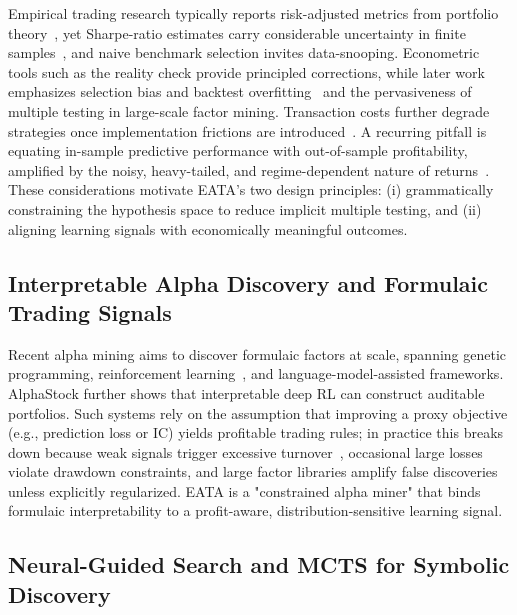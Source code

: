 \documentclass{elektr}
\theoremstyle{corollary}
\theoremstyle{lemma}
\theoremstyle{proposition}
\theoremstyle{axiom}
\theoremstyle{conjecture}
\theoremstyle{example}
\theoremstyle{definition}
\theoremstyle{remark}
\begin{document}
Empirical trading research typically reports risk-adjusted metrics from portfolio theory~\cite{markowitz1952portfolio,sharpe1966mutual}, yet Sharpe-ratio estimates carry considerable uncertainty in finite samples~\cite{lo2002sharpe_stats}, and naive benchmark selection invites data-snooping. Econometric tools such as the reality check provide principled corrections, while later work emphasizes selection bias and backtest overfitting~\cite{bailey2014deflated_sharpe} and the pervasiveness of multiple testing in large-scale factor mining. Transaction costs further degrade strategies once implementation frictions are introduced~\cite{keim1997transaction_costs}. A recurring pitfall is equating in-sample predictive performance with out-of-sample profitability, amplified by the noisy, heavy-tailed, and regime-dependent nature of returns~\cite{cont2001empirical}. These considerations motivate EATA's two design principles: (i) grammatically constraining the hypothesis space to reduce implicit multiple testing, and (ii) aligning learning signals with economically meaningful outcomes.

\subsection{Interpretable Alpha Discovery and Formulaic Trading Signals}

Recent alpha mining aims to discover formulaic factors at scale, spanning genetic programming, reinforcement learning~\cite{yu2023alphagen}, and language-model-assisted frameworks. AlphaStock further shows that interpretable deep RL can construct auditable portfolios. Such systems rely on the assumption that improving a proxy objective (e.g., prediction loss or IC) yields profitable trading rules; in practice this breaks down because weak signals trigger excessive turnover~\cite{keim1997transaction_costs}, occasional large losses violate drawdown constraints, and large factor libraries amplify false discoveries unless explicitly regularized. EATA is a "constrained alpha miner" that binds formulaic interpretability to a profit-aware, distribution-sensitive learning signal.

\subsection{Neural-Guided Search and MCTS for Symbolic Discovery}
\end{document}
